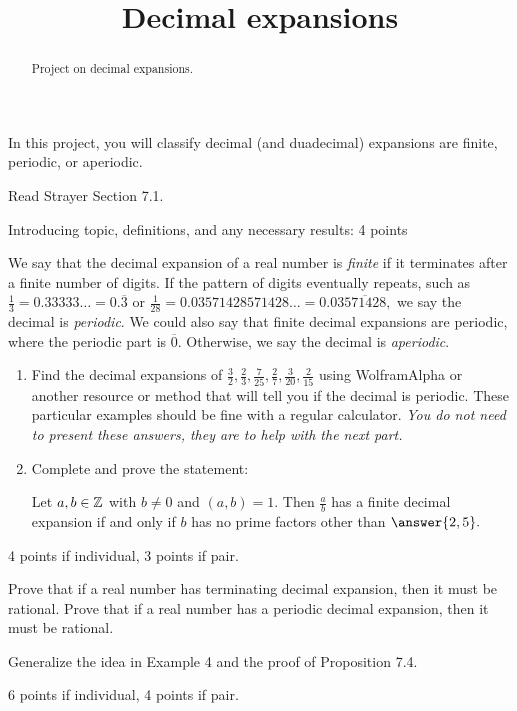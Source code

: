 \documentclass[letterpaper, 11 pt,handout,hints]{ximera}
\title{Decimal expansions}
\begin{document}
\begin{abstract}
 Project on decimal expansions.
\end{abstract}
\maketitle

In this project, you will classify decimal (and duadecimal) expansions are finite, periodic, or aperiodic.

Read Strayer Section 7.1.
\begin{rubric}
 Introducing topic, definitions, and any necessary results: 4 points 
\end{rubric}

\begin{exploration}
	We say that the decimal expansion of a real number is \emph{finite} if it terminates after a finite number of digits. If the pattern of digits eventually repeats, such as $\frac{1}{3}=0.33333\dots=0.\overline{3}$ or $\frac{1}{28}=0.03571428571428\dots=0.03\overline{571428},$ we say the decimal is \emph{periodic}. We could also say that finite decimal expansions are periodic, where the periodic part is $\overline{0}.$ Otherwise, we say the decimal is \emph{aperiodic}.


\begin{problem}\label{prob:dec-condition}
 
	\begin{enumerate}
		\item\label{decimal-ex} Find the decimal expansions of $\frac{3}{2}, \frac{2}{3},\frac{7}{25},\frac{2}{7},\frac{3}{20},\frac{2}{15}$ using WolframAlpha or another resource or method that will tell you if the decimal is periodic. These particular examples should be fine with a regular calculator. \emph{You do not need to present these answers, they are to help with the next part.}
		\item Complete and prove the statement:		
	\begin{conjecture}
 		Let $a,b\in\mathbb Z$ with $b\neq 0$ and $(a,b)=1.$ Then $\frac{a}{b}$ has a finite decimal expansion if and only if $b$ has no prime factors other than $\answer{2,5}.$
	\end{conjecture}
	\end{enumerate}
\begin{rubric}
 4 points if individual, 3 points if pair.
\end{rubric}
\end{problem}

\begin{problem}
	Prove that if a real number has terminating decimal expansion, then it must be rational. Prove that if a real number has a periodic decimal expansion, then it must be rational. 
\begin{hint}
 Generalize the idea in Example 4 and the proof of Proposition 7.4.
\end{hint}
\begin{rubric}
 6 points if individual, 4 points if pair.
\end{rubric}
\end{problem}
\end{exploration}
\end{document}
